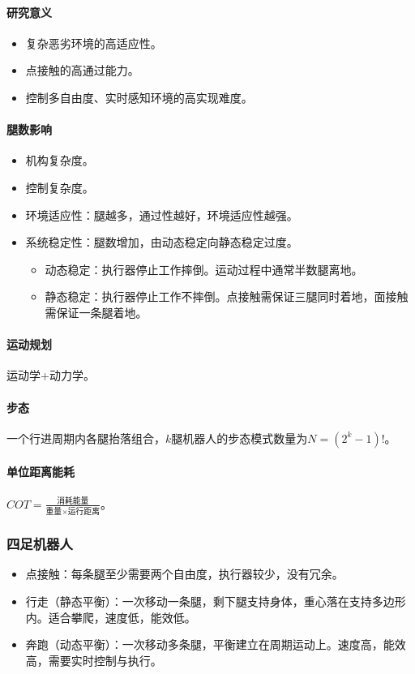 \documentclass[
12pt, %
a4paper, 
oneside, %
headinclude,footinclude, %
]{scrartcl}
\begin{document}
\paragraph{研究意义}
\begin{itemize}
\item 复杂恶劣环境的高适应性。
\item 点接触的高通过能力。
\item 控制多自由度、实时感知环境的高实现难度。
\end{itemize}
\paragraph{腿数影响}
\begin{itemize}
\item 机构复杂度。
\item 控制复杂度。
\item 环境适应性：腿越多，通过性越好，环境适应性越强。
\item 系统稳定性：腿数增加，由动态稳定向静态稳定过度。
\begin{itemize}
\item 动态稳定：执行器停止工作摔倒。运动过程中通常半数腿离地。
\item 静态稳定：执行器停止工作不摔倒。点接触需保证三腿同时着地，面接触需保证一条腿着地。
\end{itemize}
\end{itemize}
\paragraph{运动规划}
运动学+动力学。
\paragraph{步态}
一个行进周期内各腿抬落组合，$ k $腿机器人的步态模式数量为$ N = (2^k - 1)! $。
\paragraph{单位距离能耗}
$ COT = \frac{\text{消耗能量}}{\text{重量} \times \text{运行距离}} $。
\subsubsection[四足机器人]{四足机器人}
\begin{itemize}
\item 点接触：每条腿至少需要两个自由度，执行器较少，没有冗余。
\item 行走（静态平衡）：一次移动一条腿，剩下腿支持身体，重心落在支持多边形内。适合攀爬，速度低，能效低。
\item 奔跑（动态平衡）：一次移动多条腿，平衡建立在周期运动上。速度高，能效高，需要实时控制与执行。
\end{itemize}
\end{document}

